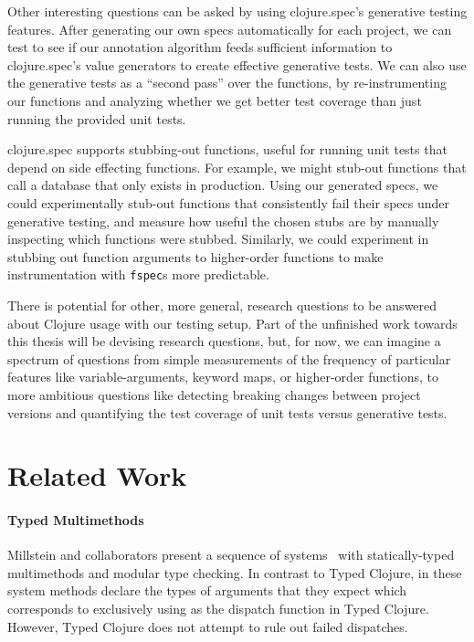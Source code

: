 \documentclass[9pt]{extarticle}
\begin{document}
Other interesting questions can be asked by using clojure.spec's generative
testing features. After generating our own specs automatically for each project,
we can test to see if our annotation algorithm feeds sufficient information
to clojure.spec's value generators to create effective generative tests.
We can also use the generative tests as a ``second pass'' over the functions,
by re-instrumenting our functions and analyzing whether we get better
test coverage than just running the provided unit tests.

clojure.spec supports stubbing-out functions, useful for running unit
tests that depend on side effecting functions. For example, we might
stub-out functions that call a database that only exists in production.
Using our generated specs, we could experimentally stub-out functions
that consistently fail their specs under generative testing,
and measure how useful the chosen stubs are by manually inspecting
which functions were stubbed.
Similarly, we could experiment in stubbing out function arguments
to higher-order functions to make instrumentation with \texttt{fspec}s
more predictable.


There is potential for other, more general, research questions
to be answered about Clojure usage with our testing setup.
Part of the unfinished work towards this thesis will be devising research questions,
but, for now, we can imagine a spectrum of questions
from simple measurements of the frequency of particular features like variable-arguments,
keyword maps, or higher-order functions, to more ambitious questions
like detecting breaking changes between project versions
and quantifying the test coverage of unit tests versus generative tests.

\section{Related Work}

\paragraph{Typed Multimethods} 
Millstein and collaborators present a sequence of
systems~\cite{Chambers:1992:OMC,Chambers:1994:TMM,MS02} with statically-typed multimethods
and modular type checking.  In contrast to Typed Clojure, in these
system methods declare the types of arguments that they expect which
corresponds to exclusively using  as the dispatch function
in Typed Clojure. However, Typed Clojure does not attempt to rule out
failed dispatches.
\end{document}
